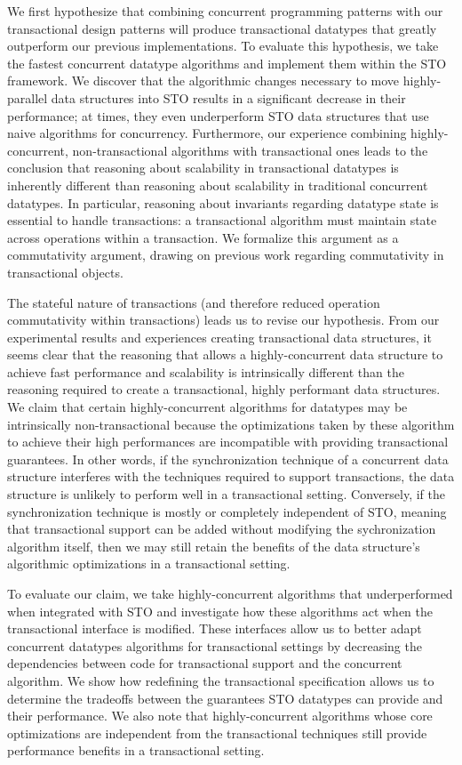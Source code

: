 We first hypothesize that combining concurrent programming patterns with our transactional design patterns will produce transactional datatypes that greatly outperform our previous implementations. To evaluate this hypothesis, we take the fastest concurrent datatype algorithms and implement them within the STO framework. We discover that the algorithmic changes necessary to move highly-parallel data structures into STO results in a significant decrease in their performance; at times, they even underperform STO data structures that use naive algorithms for concurrency.
Furthermore, our experience combining highly-concurrent, non-transactional algorithms with transactional ones leads to the conclusion that reasoning about scalability in transactional datatypes is inherently different than reasoning about scalability in traditional concurrent datatypes. In particular, reasoning about invariants regarding datatype state is essential to handle transactions: a transactional algorithm must maintain state across operations within a transaction. We formalize this argument as a commutativity argument, drawing on previous work regarding commutativity in transactional objects\cite{weihl}.

The stateful nature of transactions (and therefore reduced operation commutativity within transactions) leads us to revise our hypothesis. From our experimental results and experiences creating transactional data structures, it seems clear that the reasoning that allows a highly-concurrent data structure to achieve fast performance and scalability is intrinsically different than the reasoning required to create a transactional, highly performant data structures. 
We claim that certain highly-concurrent algorithms for datatypes may be intrinsically non-transactional because the optimizations taken by these algorithm to achieve their high performances are incompatible with providing transactional guarantees. In other words, if the synchronization technique of a concurrent data structure interferes with the techniques required to support transactions, the data structure is unlikely to perform well in a transactional setting. Conversely, if the synchronization technique is mostly or completely independent of STO, meaning that transactional support can be added without modifying the sychronization algorithm itself, then we may still retain the benefits of the data structure's algorithmic optimizations in a transactional setting.

To evaluate our claim, we take highly-concurrent algorithms that underperformed when integrated with STO and investigate how these algorithms act when the transactional interface is modified. These interfaces allow us to better adapt concurrent datatypes algorithms for transactional settings by decreasing the dependencies between code for transactional support and the concurrent algorithm.
We show how redefining the transactional specification allows us to determine the tradeoffs between the guarantees STO datatypes can provide and their performance. We also note that highly-concurrent algorithms whose core optimizations are independent from the transactional techniques still provide performance benefits in a transactional setting.

